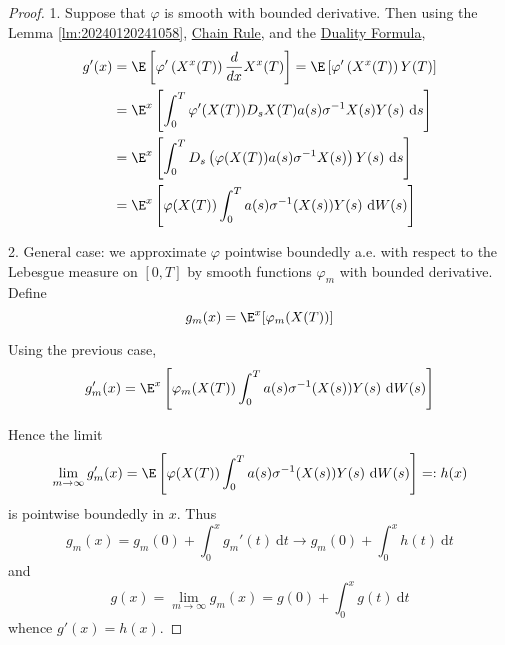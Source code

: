 \begin{proof}
1. Suppose that $\varphi$ is smooth with bounded derivative. Then using the Lemma \ref{lm:20240120241058}, \hyperref[thm:chain_rule]{Chain Rule}, and the \hyperref[cor:duality-formula]{Duality Formula}, 
\begin{equation*}
\begin{aligned}
	g^{\prime}(x) & = \E\left[\varphi^{\prime}\left(X^x(T)\right) \frac{d}{d x} X^x(T)\right]=\E\left[\varphi^{\prime}\left(X^x(T)\right) Y(T)\right] \\
	& = \E^x\left[\int_0^T \varphi^{\prime}(X(T)) D_s X(T) a(s) \sigma^{-1} X(s) Y(s) ~\mathrm{d}s \right] \\
	& = \E^x\left[\int_0^T D_s\left(\varphi(X(T)) a(s) \sigma^{-1} X(s)\right) Y(s) ~\mathrm{d} s \right] \\
	& = \E^x\left[\varphi(X(T)) \int_0^T a(s) \sigma^{-1}(X(s)) Y(s) ~\mathrm{d} W(s)\right]
\end{aligned}
\end{equation*}

2. General case: we approximate $\varphi$ pointwise boundedly a.e. with respect to the Lebesgue measure on $[0,T]$ by smooth functions $\varphi_m$ with bounded derivative. Define
\[
g_m(x) = \E^x[\varphi_m(X(T))]
\]

Using the previous case, 
\[
g_m'(x) = \E^x \left[ \varphi_m(X(T)) \int_0^T a(s) \sigma^{-1}(X(s)) Y(s) ~\mathrm{d}W(s) \right]
\]

Hence the limit
\[
\lim_{m \to \infty} g_m'(x) = \E \left[ \varphi(X(T)) \int_0^T a(s) \sigma^{-1}(X(s)) Y(s) ~\mathrm{d}W(s) \right] =: h(x)
\]
is pointwise boundedly in $x$. Thus
\[
g_m(x) = g_m(0) + \int_0^x g_m'(t) ~\mathrm{d}t \longrightarrow g_m(0) + \int_0^x h(t)~\mathrm{d}t
\]
and
\[
g(x) = \lim_{m \to \infty} g_m(x) = g(0) + \int_0^x g(t) ~\mathrm{d}t
\]
whence $g'(x) = h(x)$.
\end{proof}

%
